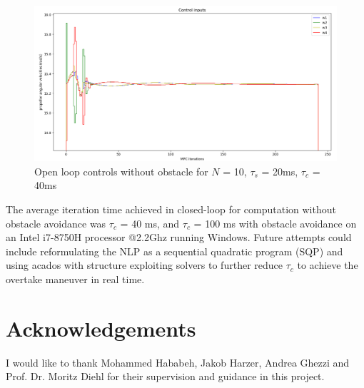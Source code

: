 \documentclass[conference]{IEEEtran}
\begin{document}
\begin{figure}[t!]
	\centerline{\includegraphics[scale = 0.45]{figures/Screenshot_OL_U.png} }
	\caption{Open loop controls without obstacle for $N$ = 10, $\tau_s$ = 20ms, $\tau_c$ = 40ms}
	\label{Fig5}
\end{figure}

The average iteration time achieved in closed-loop for computation without obstacle avoidance was $\tau_{c}$ = 40 ms, and $\tau_{c}$ = 100 ms with obstacle avoidance on an Intel i7-8750H processor @2.2Ghz running Windows. Future attempts could include reformulating the NLP as a sequential quadratic program (SQP) and using acados \cite{verschueren_acados_2020} with structure exploiting solvers to further reduce $\tau_c$ to achieve the overtake maneuver in real time.



\section{Acknowledgements}\label{Section7}
I would like to thank Mohammed Hababeh, Jakob Harzer, Andrea Ghezzi and Prof. Dr. Moritz Diehl for their supervision and guidance in this project.



\end{document}
